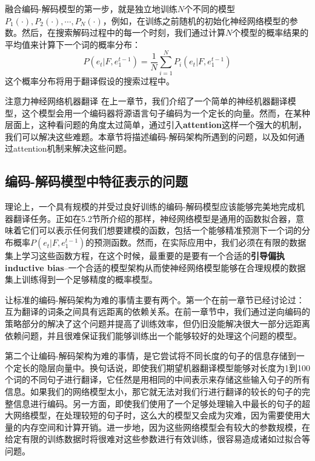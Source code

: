 \documentclass[10pt,a4paper]{ctexart}
\makeatletter
\renewcommand{\section}{\@startsection{section}{1}{0mm}
  {-\baselineskip}{0.5\baselineskip}{\bf\leftline}}
\makeatother
\begin{document}
融合编码-解码模型的第一步，就是独立地训练$N$个不同的模型$P_1(\cdot),P_2(\cdot),\cdots,P_N(\cdot)$，例如，在训练之前随机的初始化神经网络模型的参数。然后，在搜索解码过程中的每一个时刻，我们通过计算$N$个模型的概率结果的平均值来计算下一个词的概率分布：
\[
 P(e_t | F,e_1^{t-1}) = \frac{1}{N} \sum_{i=1}^{N} P_i(e_t | F,e_1^{t-1})
\]
这个概率分布将用于翻译假设的搜索过程中。


\newpage
\section{注意力神经网络机器翻译}
在上一章节，我们介绍了一个简单的神经机器翻译模型，这个模型会用一个编码器将源语言句子编码为一个定长的向量。然而，在某种层面上，这种看问题的角度太过简单，通过引入\textbf{attention}这样一个强大的机制，我们可以解决这些难题。本章节将描述编码-解码架构所遇到的问题，以及如何通过attention机制来解决这些问题。

\subsection{编码-解码模型中特征表示的问题}
理论上，一个具有规模的并受过良好训练的编码-解码模型应该能够完美地完成机器翻译任务。正如在5.2节所介绍的那样，神经网络模型是通用的函数拟合器，意味着它们可以表示任何我们想要建模的函数，包括一个能够精准预测下一个词的分布概率$P(e_t | F,e_1^{t-1})$的预测函数。然而，在实际应用中，我们必须在有限的数据集上学习这些函数方程，在这个时候，最重要的是要有一个合适的\textbf{引导偏执inductive bias}--一个合适的模型架构从而使神经网络模型能够在合理规模的数据集上训练得到一个足够精度的概率模型。

让标准的编码-解码架构为难的事情主要有两个。第一个在前一章节已经讨论过：互为翻译的词条之间具有远距离的依赖关系。在前一章节中，我们通过逆向编码的策略部分的解决了这个问题并提高了训练效率，但仍旧没能解决很大一部分远距离依赖问题，并且很难保证我们能够训练出一个能够较好的处理这个问题的模型。

第二个让编码-解码架构为难的事情，是它尝试将不同长度的句子的信息存储到一个定长的隐层向量中。换句话说，即使我们期望机器翻译模型能够对长度为1到100个词的不同句子进行翻译，它任然是用相同的中间表示来存储这些输入句子的所有信息。如果我们的网络模型太小，那它就无法对我们行进行翻译的较长的句子的完整信息进行编码。另一方面，即使我们使用了一个足够处理输入中最长的句子的超大网络模型，在处理较短的句子时，这么大的模型又会成为灾难，因为需要使用大量的内存空间和计算开销。进一步地，因为这些网络模型会有较大的参数规模，在给定有限的训练数据时将很难对这些参数进行有效训练，很容易造成诸如过拟合等问题。
\end{document}
